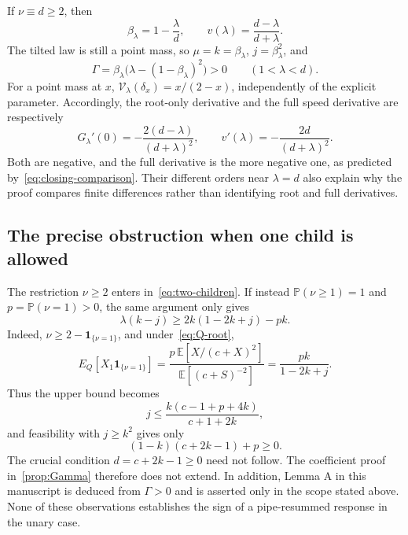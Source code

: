 \documentclass[11pt,a4paper]{article}
\numberwithin{equation}{section}
\theoremstyle{plain}
\theoremstyle{definition}
\theoremstyle{remark}
\newcommand{\E}{\mathbb E}
\newcommand{\Prob}{\mathbb P}
\newcommand{\V}{\mathcal V}
\newcommand{\one}{\mathbf 1}
\begin{document}
If $\nu\equiv d\ge2$, then
\begin{equation}
 \beta_\lambda=1-\frac\lambda d,
 \qquad
 v(\lambda)=\frac{d-\lambda}{d+\lambda}.
\end{equation}
The tilted law is still a point mass, so
$\mu=k=\beta_\lambda$, $j=\beta_\lambda^2$, and
\begin{equation}
 \Gamma=\beta_\lambda
       \bigl(\lambda-(1-\beta_\lambda)^2\bigr)>0
 \qquad(1<\lambda<d).
\end{equation}
For a point mass at $x$, $\V_\lambda(\delta_x)=x/(2-x)$, independently of
the explicit parameter.  Accordingly, the root-only derivative and the
full speed derivative are respectively
\begin{equation}\label{eq:regular-check}
 G_\lambda'(0)=-\frac{2(d-\lambda)}{(d+\lambda)^2},
 \qquad
 v'(\lambda)=-\frac{2d}{(d+\lambda)^2}.
\end{equation}
Both are negative, and the full derivative is the more negative one,
as predicted by~\eqref{eq:closing-comparison}.  Their different orders
near $\lambda=d$ also explain why the proof compares finite differences
rather than identifying root and full derivatives.

\subsection{The precise obstruction when one child is allowed}

The restriction $\nu\ge2$ enters in~\eqref{eq:two-children}.  If instead
$\Prob(\nu\ge1)=1$ and $p=\Prob(\nu=1)>0$, the same argument only gives
\begin{equation}\label{eq:unary-constraint}
 \lambda(k-j)\ge2k(1-2k+j)-pk.
\end{equation}
Indeed,
$\nu\ge2-\one_{\{\nu=1\}}$, and under~\eqref{eq:Q-root},
\begin{equation}
 E_Q[X_1\one_{\{\nu=1\}}]
 =\frac{p\,\E[X/(c+X)^2]}{\E[(c+S)^{-2}]}
 =\frac{pk}{1-2k+j}.
\end{equation}
Thus the upper bound becomes
\begin{equation}\label{eq:unary-jupper}
 j\le\frac{k(c-1+p+4k)}{c+1+2k},
\end{equation}
and feasibility with $j\ge k^2$ gives only
\begin{equation}
 (1-k)(c+2k-1)+p\ge0.
\end{equation}
The crucial condition $d=c+2k-1\ge0$ need not follow.  The coefficient
proof in~\cref{prop:Gamma} therefore does not extend.  In addition,
Lemma A in this manuscript is deduced from $\Gamma>0$ and is asserted
only in the scope stated above.  None of these observations establishes
the sign of a pipe-resummed response in the unary case.
\end{document}
